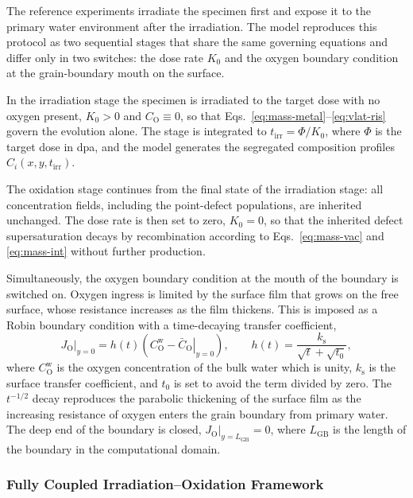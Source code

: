 \documentclass[3p,times,nonatbib]{elsarticle} %
\newcommand{\GB}{\mathrm{GB}}
\newcommand{\Ox}{\mathrm{O}}           %
\begin{document}
The reference experiments \cite{deng2017effect,deng2021grain} irradiate the specimen first and expose it to the primary water environment after the irradiation. The model reproduces this protocol as two sequential stages that share the same governing equations and differ only in two switches: the dose rate \(K_0\) and the oxygen boundary condition at the grain-boundary mouth on the surface.

In the irradiation stage the specimen is irradiated to the target dose with no oxygen
present, \(K_0>0\) and \(C_{\Ox}\equiv 0\), so that
Eqs.~\eqref{eq:mass-metal}--\eqref{eq:vlat-ris} govern the evolution alone. The stage is integrated to
\(t_{\mathrm{irr}}=\Phi/K_0\), where \(\Phi\) is the target dose in dpa, and the model generates the segregated composition profiles \(C_i(x,y,t_{\mathrm{irr}})\).

The oxidation stage continues from the final state of the irradiation stage: all concentration fields, including the point-defect populations, are inherited unchanged. The dose rate is then set to zero,
\(K_0=0\), so that the inherited defect supersaturation decays by recombination according to Eqs.~\eqref{eq:mass-vac} and \eqref{eq:mass-int} without further production.

Simultaneously, the oxygen boundary condition at the mouth of the boundary is switched on. Oxygen ingress is limited by the surface film that grows on the free surface, whose resistance increases as the film thickens. This is imposed as a Robin boundary condition with a time-decaying transfer coefficient,
\begin{equation}
\left.J_{\Ox}\right|_{y=0}
= h(t)\left(C_{\Ox}^{\mathrm{w}}-\left.\bar{C}_{\Ox}\right|_{y=0}\right),
\qquad
h(t)=\frac{k_{\mathrm{s}}}{\sqrt{t}+\sqrt{t_0}} ,
\label{eq:robin}
\end{equation}
where \(C_{\Ox}^{\mathrm{w}}\) is the oxygen concentration of the bulk water which is unity, \(k_{\mathrm{s}}\) is the surface transfer coefficient, and \(t_0\) is set to avoid the term divided by zero. The \(t^{-1/2}\) decay reproduces the parabolic thickening of the surface film as the increasing resistance of oxygen enters the grain boundary from primary water. The deep end of the boundary is closed,
\(\left.J_{\Ox}\right|_{y=L_{\GB}}=0\), where \(L_{\GB}\) is the length of
the boundary in the computational domain.

\subsubsection{Fully Coupled Irradiation--Oxidation Framework}
\label{sec:methodFullyCoupled}
\end{document}
